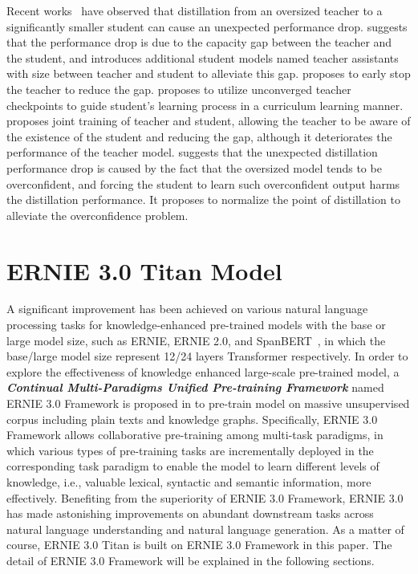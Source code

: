 Recent works~\cite{teacher-assistant, KDefficacy, rco, skd, akd} have observed that distillation from an oversized teacher to a significantly smaller student can cause an unexpected performance drop. \cite{teacher-assistant} suggests that the performance drop is due to the capacity gap between the teacher and the student, and introduces additional student models named teacher assistants with size between teacher and student to alleviate this gap. \cite{KDefficacy} proposes to early stop the teacher to reduce the gap. \cite{rco} proposes to utilize unconverged teacher checkpoints to guide student's learning process in a curriculum learning manner. \cite{follow-your-path} proposes joint training of teacher and student, allowing the teacher to be aware of the existence of the student and reducing the gap, although it deteriorates the performance of the teacher model. \cite{skd} suggests that the unexpected distillation performance drop is caused by the fact that the oversized model tends to be overconfident, and forcing the student to learn such overconfident output harms the distillation performance. It proposes to normalize the point of distillation to alleviate the overconfidence problem.  

\section{ERNIE 3.0 Titan Model} 

A significant improvement has been achieved on various natural language processing tasks for knowledge-enhanced pre-trained models with the base or large model size, such as ERNIE, ERNIE 2.0, and SpanBERT~\cite{joshi2020spanbert}, in which the base/large model size represent 12/24 layers Transformer respectively. In order to explore the effectiveness of knowledge enhanced large-scale pre-trained model, a \textbf{\textit{Continual Multi-Paradigms Unified Pre-training Framework}} named ERNIE 3.0 Framework is proposed in \cite{sun2021ernie} to pre-train model on massive unsupervised corpus including plain texts and knowledge graphs. Specifically, ERNIE 3.0 Framework allows collaborative pre-training among multi-task paradigms, in which various types of pre-training tasks are incrementally deployed in the corresponding task paradigm to enable the model to learn different levels of knowledge, i.e., valuable lexical, syntactic and semantic information, more effectively. Benefiting from the superiority of ERNIE 3.0 Framework, ERNIE 3.0 has made astonishing improvements on abundant downstream tasks across natural language understanding and natural language generation. As a matter of course, ERNIE 3.0 Titan is built on ERNIE 3.0 Framework in this paper. The detail of ERNIE 3.0 Framework will be explained in the following sections.

